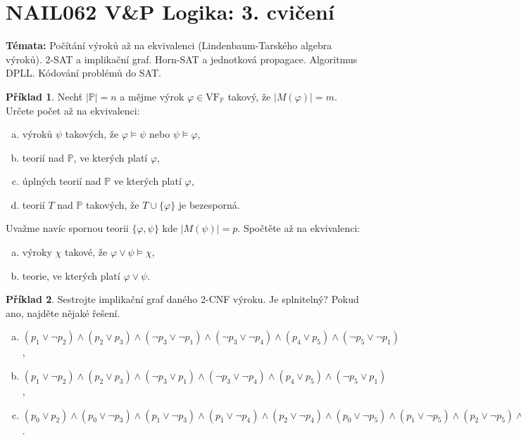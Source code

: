 \documentclass[a4paper]{article}
\theoremstyle{definition}
\newtheorem{problem}{Příklad}
\begin{document}
\section*{NAIL062 V\&P Logika: 3. cvičení}


\textbf{Témata:} 
Počítání výroků až na ekvivalenci (Lindenbaum-Tarského algebra výroků). 2-SAT a implikační graf. Horn-SAT a jednotková propagace. Algoritmus DPLL. Kódování problémů do SAT.


\medskip\begin{problem}
    Nechť $|\mathbb{P}|=n$ a mějme výrok $\varphi\in\mathrm{VF}_{\mathbb{P}}$ takový, že $|M(\varphi)|=m$. Určete počet až na ekvivalenci:
    \begin{enumerate}[(a)]
    \item výroků $\psi$ takových, že $\varphi \models \psi$ nebo $\psi \models \varphi$,
    \item teorií nad $\mathbb{P}$, ve kterých platí $\varphi$,
    \item úplných teorií nad $\mathbb{P}$ ve kterých platí $\varphi$,
    \item teorií $T$ nad $\mathbb{P}$ takových, že $T \cup \{\varphi\}$ je bezesporná.
    \end{enumerate}
    Uvažme navíc spornou teorii $\{\varphi,\psi\}$ kde $|M(\psi)|=p$. Spočtěte až na ekvivalenci:
    \begin{enumerate}[(a)]
    \item[(e)] výroky $\chi$ takové, že $\varphi \vee \psi \models \chi$, 
    \item[(f)] teorie, ve kterých platí $\varphi \vee \psi$.
    \end{enumerate}
\end{problem}

    
\medskip\begin{problem} Sestrojte implikační graf daného 2-CNF výroku. Je splnitelný? Pokud ano, najděte nějaké řešení.
\begin{enumerate}[(a)]
    \item $(p_1\vee \neg p_2)\wedge (p_2\vee p_3)\wedge (\neg p_3\vee \neg p_1)\wedge (\neg p_3\vee \neg p_4)\wedge (p_4\vee p_5)\wedge (\neg p_5\vee \neg p_1)$,
    \item $(p_1\vee \neg p_2)\wedge (p_2\vee p_3)\wedge (\neg p_3\vee p_1)\wedge (\neg p_3\vee \neg p_4)\wedge (p_4\vee p_5)\wedge (\neg p_5\vee p_1)$,
    \item $(p_0 \vee  p_2) \wedge  (p_0 \vee  \neg p_3) \wedge  (p_1 \vee  \neg p_3) 
    \wedge  (p_1 \vee  \neg p_4) \wedge  (p_2 \vee  \neg p_4) 
    \wedge  (p_0 \vee  \neg p_5)
    \wedge 
    (p_1 \vee  \neg p_5) \wedge  (p_2 \vee  \neg p_5) \wedge  (\neg p_1 \vee  \neg p_6) \wedge  (p_4 \vee  p_6) \wedge  (p_5 \vee  p_6) \wedge  p_1\wedge \neg p_7$.
\end{enumerate}
\end{problem}
\end{document}
